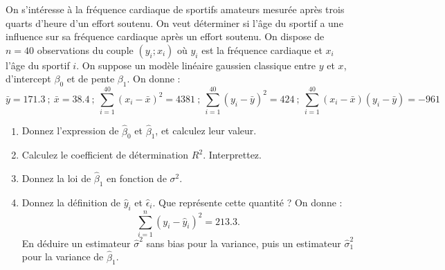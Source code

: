 \documentclass{../headers/td_upc}
\providecommand{\1}{\mathds{1}}
\begin{document}
	\cor{\newpage}
	
	On s'intéresse à la fréquence cardiaque de sportifs amateurs mesurée après
	trois quarts d'heure d'un effort soutenu.
	On veut déterminer si l'âge du sportif a une influence sur sa fréquence cardiaque
	après un effort soutenu. On dispose de $n = 40$ observations du couple 
	$(y_i;x_i)$ où $y_i$ est la fréquence cardiaque et $x_i$ l'âge du
	sportif $i$.
	On suppose un modèle linéaire gaussien classique entre $y$ et $x$,
	d'intercept $\beta_0$ et de pente $\beta_1$.
	On donne :
	\[
	\bar y = 171.3
	~ ; ~
	\bar x = 38.4
	~ ; ~
	\sum_{i=1}^{40} (x_i - \bar x)^2 = 4381
	~ ; ~
	\sum_{i=1}^{40} (y_i - \bar y)^2 = 424
	~ ; ~
	\sum_{i=1}^{40} (x_i - \bar x)(y_i - \bar y) = -961
	\]
	\begin{enumerate}
	\item Donnez l'expression de $\hat \beta_0$ et $\hat \beta_1$, et calculez leur valeur.
	\cor{
	\[
	\hat \beta_1 
	= \frac{s^2_{x,y}}{s^2_x} 
	= \frac{\sum_{i=1}^{40} (x_i - \bar x)(y_i - \bar y)}{\sum_{i=1}^{40} (x_i - \bar x)^2}
	= \frac{-961}{4381}
	= -0.2193563
	\]
	\[
	\hat\beta_0 
	= \bar y - \hat \beta_1 \bar x
	= 171.3 - (-0.2193563) \times 38.4
	= 179.7233
	\]
	}
	\item Calculez le coefficient de détermination $R^2$. Interprettez.
	\item Donnez la loi de $\hat \beta_1$ en fonction de $\sigma^2$.
	\cor{
	\[
	\hat \beta_1 \sim \mathcal{N}\left(\beta_1, \frac{\sigma^2}{\sum_{i=1}^n (x_i - \bar x)^2}\right)
	\]
	}
	\item Donnez la définition de $\hat y_i$ et $\hat \epsilon_i$.
	Que représente cette quantité ? On donne :
	\[
	\sum_{i=1}^n (y_i - \hat y_i)^2 = 213.3.
	\]
	En déduire un estimateur $\hat\sigma^2$ sans bias pour la variance, 
	puis un estimateur $\hat\sigma^2_1$ pour la variance de $\hat\beta_1$.
\end{enumerate}
\end{document}
